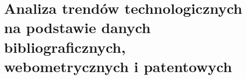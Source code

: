 \section{Analiza trendów technologicznych na podstawie danych bibliograficznych, webometrycznych i patentowych}
\label{sec:analiza_trend_w_technologicznych_na_podstawie_danych_bibliograficznych_webometrycznych_i_patentowych}


